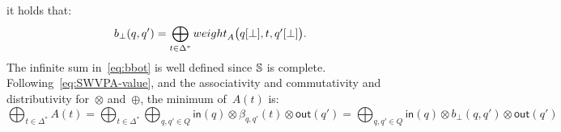 it holds that:
%
\begin{equation}\label{eq:bbot}
  b_\bot(q, q') = \bigoplus_{t\in \Delta^*}
  \textstyle
  \weight_A\bigl(\config{q}{\bot}, t, \config{q'}{\bot}\bigr).
\end{equation}
The infinite sum in~\eqref{eq:bbot} is well defined since $\mathbb{S}$ is complete.
%
Following~\eqref{eq:SWVPA-value}, and the associativity and commutativity
and distributivity for~$\otimes$ and~$\oplus$, the minimum of~$A(t)$ is:
\begin{equation}\label{eq:min}
{\displaystyle\bigoplus_{t\in \Delta^*}} A(t)
=
{\displaystyle\bigoplus_{t\in \Delta^*}}
{\displaystyle\bigoplus_{q, q' \in Q}} \textstyle
\mathsf{in}(q) \mathop{\otimes}
\beta_{q, q'}(t)
\mathop{\otimes} \mathsf{out}(q')
=
{\displaystyle\bigoplus_{q, q' \in Q}} \textstyle
\mathsf{in}(q) \mathop{\otimes}
b_\bot(q, q')
\mathop{\otimes} \mathsf{out}(q')
\end{equation}

